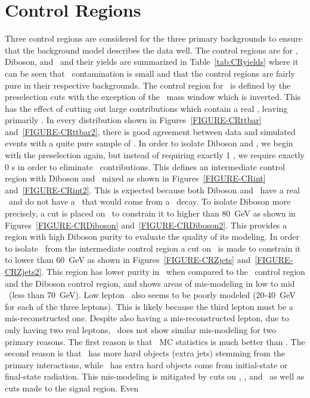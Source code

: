 

\clearpage

\section{Control Regions}
\label{SECTION-CONTROL-REGIONS}

Three control regions are considered for the three primary backgrounds to ensure that the background model describes the data well. The control regions are for \TTB, Diboson, and \zjets~and their yields are summarized in Table~\ref{tab:CRyields} where it can be seen that \tz~contamination is small and that the control regions are fairly pure in their respective backgrounds. The control region for \TTB~is defined by the preselection cuts with the exception of the \azhyph~mass window which is inverted. This has the effect of cutting out large contributions which contain a real \az, leaving primarily \TTB. In every distribution shown in Figures~\ref{FIGURE-CRttbar} and~\ref{FIGURE-CRttbar2}, there is good agreement between data and simulated events with a quite pure sample of \TTB. In order to isolate Diboson and \zjets , we begin with the preselection again, but instead of requiring exactly 1 \bjet, we require exactly 0 \bjet s in order to eliminate \athyph~contributions. This defines an intermediate control region with Diboson and \zjets~mixed as shown in Figures~\ref{FIGURE-CRint} and~\ref{FIGURE-CRint2}. This is expected because both Diboson and \zjets~have a real \az~and do not have a \ab~that would come from a \athyph~decay. To isolate Diboson more precisely, a cut is placed on \wtm~to constrain it to higher than 80~GeV as shown in Figures~\ref{FIGURE-CRDiboson} and~\ref{FIGURE-CRDiboson2}. This provides a region with high Diboson purity to evaluate the quality of its modeling. In order to isolate \zjets~from the intermediate control region a cut on \met~is made to constrain it to lower than 60~GeV as shown in Figures~\ref{FIGURE-CRZjets} and~\ref{FIGURE-CRZjets2}. This region has lower purity in \zjets~when compared to the \TTB~control region and the Diboson control region, and shows areas of mis-modeling in low to mid \wtm~(less than 70~GeV). Low lepton \PT~also seems to be poorly modeled (20-40~GeV for each of the three leptons). This is likely because the third lepton must be a mis-reconstructed one. Despite also having a mis-reconstructed lepton, due to only having two real leptons, \TTB~does not show similar mis-modeling for two primary reasons. The first reason is that \TTB~MC statistics is much better than \zjets. The second reason is that \TTB~has more hard objects (extra jets) stemming from the primary interactions, while \zjets~has extra hard objects come from initial-state or final-state radiation. This mis-modeling is mitigated by cuts on \PT, \wtm, and \met~as well as cuts made to the signal region. Even 